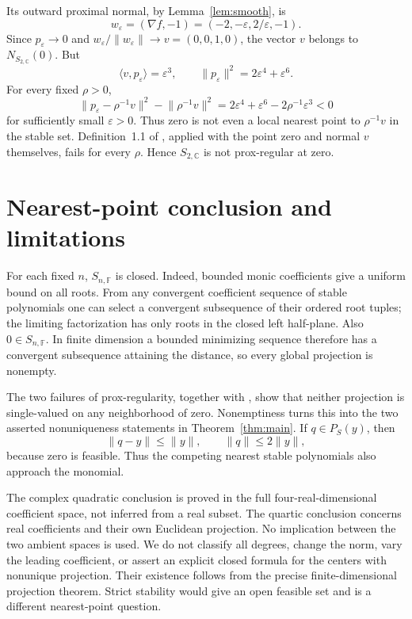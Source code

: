 \documentclass[11pt]{article}
\newcommand{\C}{\mathbb C}
\newcommand{\ip}[2]{\langle #1,#2\rangle}
\newcommand{\norm}[1]{\lVert #1\rVert}
\begin{document}
Its outward proximal normal, by Lemma~\ref{lem:smooth}, is
\[
 w_\varepsilon=(\nabla f,-1)
       =(-2,-\varepsilon,2/\varepsilon,-1).
\]
Since \(p_\varepsilon\to0\) and
\(w_\varepsilon/\norm{w_\varepsilon}\to v=(0,0,1,0)\),
the vector \(v\) belongs to \(N_{S_{2,\C}}(0)\).
But
\[
 \ip{v}{p_\varepsilon}=\varepsilon^3,\qquad
 \norm{p_\varepsilon}^2=2\varepsilon^4+\varepsilon^6.
\]
For every fixed \(\rho>0\),
\[
 \norm{p_\varepsilon-\rho^{-1}v}^2-\norm{\rho^{-1}v}^2
 =2\varepsilon^4+\varepsilon^6-2\rho^{-1}\varepsilon^3<0
\]
for sufficiently small \(\varepsilon>0\). Thus zero is not even a local nearest point to \(\rho^{-1}v\) in the stable set. Definition~1.1 of \cite{prt}, applied with the point zero and normal \(v\) themselves, fails for every \(\rho\). Hence \(S_{2,\C}\) is not prox-regular at zero.

\section{Nearest-point conclusion and limitations}

For each fixed \(n\), \(S_{n,\mathbb F}\) is closed. Indeed, bounded monic coefficients give a uniform bound on all roots. From any convergent coefficient sequence of stable polynomials one can select a convergent subsequence of their ordered root tuples; the limiting factorization has only roots in the closed left half-plane. Also \(0\in S_{n,\mathbb F}\). In finite dimension a bounded minimizing sequence therefore has a convergent subsequence attaining the distance, so every global projection is nonempty.

The two failures of prox-regularity, together with
\cite[Theorem~1.3(a),(k)]{prt}, show that neither projection is single-valued on any neighborhood of zero. Nonemptiness turns this into the two asserted nonuniqueness statements in Theorem~\ref{thm:main}. If \(q\in P_S(y)\), then
\[
 \norm{q-y}\leq\norm{y},\qquad \norm{q}\leq2\norm{y},
\]
because zero is feasible. Thus the competing nearest stable polynomials also approach the monomial.

The complex quadratic conclusion is proved in the full four-real-dimensional coefficient space, not inferred from a real subset. The quartic conclusion concerns real coefficients and their own Euclidean projection. No implication between the two ambient spaces is used. We do not classify all degrees, change the norm, vary the leading coefficient, or assert an explicit closed formula for the centers with nonunique projection. Their existence follows from the precise finite-dimensional projection theorem. Strict stability would give an open feasible set and is a different nearest-point question.
\end{document}
